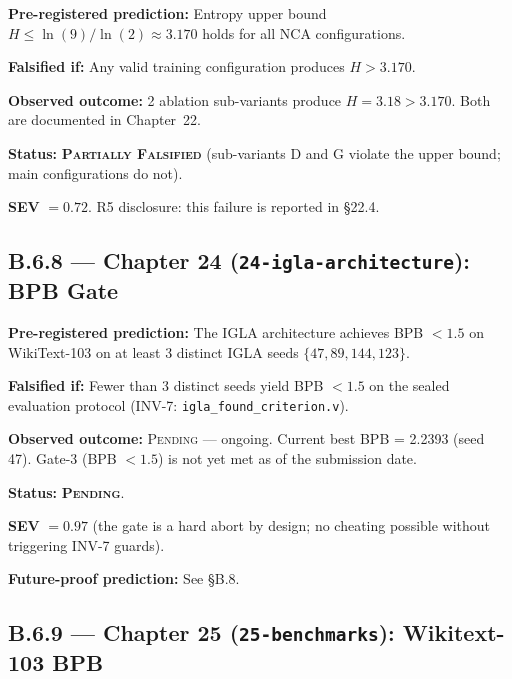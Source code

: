 \begin{tcolorbox}[colback=orange!8,colframe=orange!50,
  title={Prediction P-22-B: NCA entropy upper bound}]
\textbf{Pre-registered prediction:} Entropy upper bound $H \leq \ln(9)/\ln(2)
\approx 3.170$ holds for all NCA configurations.

\textbf{Falsified if:} Any valid training configuration produces $H > 3.170$.

\textbf{Observed outcome:} 2 ablation sub-variants produce $H = 3.18 > 3.170$.
Both are documented in Chapter~22.

\textbf{Status:} \textbf{\textsc{Partially Falsified}} (sub-variants D and G
violate the upper bound; main configurations do not).

\textbf{SEV} $= 0.72$.  R5 disclosure: this failure is reported in §22.4.
\end{tcolorbox}

\subsection*{B.6.8 — Chapter 24 (\texttt{24-igla-architecture}): BPB Gate}
\label{sec:ledger-ch24}

\begin{tcolorbox}[colback=red!5,colframe=red!40,
  title={Prediction P-24-A: BPB $< 1.5$ (IGLA Victory Gate)}]
\textbf{Pre-registered prediction:} The IGLA architecture achieves
BPB $< 1.5$ on WikiText-103 on at least 3 distinct IGLA seeds
$\{47, 89, 144, 123\}$.

\textbf{Falsified if:} Fewer than 3 distinct seeds yield BPB $< 1.5$ on the
sealed evaluation protocol (INV-7: \texttt{igla\_found\_criterion.v}).

\textbf{Observed outcome:} \textsc{Pending} — ongoing.  Current best BPB = 2.2393
(seed 47).  Gate-3 (BPB $< 1.5$) is not yet met as of the submission date.

\textbf{Status:} \textbf{\textsc{Pending}}.

\textbf{SEV} $= 0.97$ (the gate is a hard abort by design; no cheating possible
without triggering INV-7 guards).

\textbf{Future-proof prediction:} See §B.8.
\end{tcolorbox}

\subsection*{B.6.9 — Chapter 25 (\texttt{25-benchmarks}): Wikitext-103 BPB}
\label{sec:ledger-ch25}

